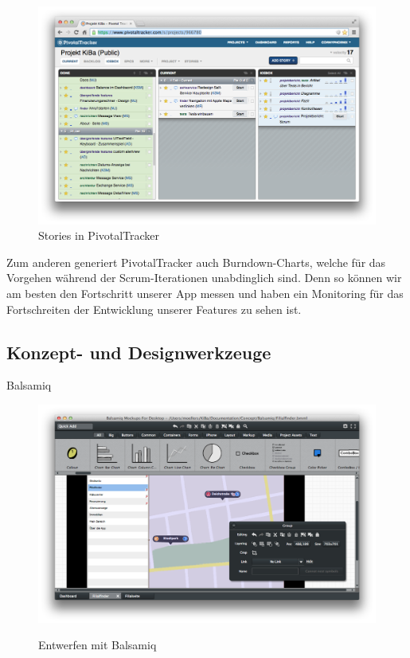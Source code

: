 \begin{figure}[h!]
	\centering
	\includegraphics[scale=.25]{Pictures/TrackerStories}
	\vspace{-.8cm}
	\caption{Stories in PivotalTracker\label{fig:TrackerStories}}
\end{figure}

	Zum anderen generiert PivotalTracker auch Burndown-Charts, welche für das Vorgehen während der Scrum-Iterationen unabdinglich sind. Denn so können wir am besten den Fortschritt unserer App messen und haben ein Monitoring für das Fortschreiten der Entwicklung unserer Features zu sehen ist.

\subsection{Konzept- und Designwerkzeuge}
Balsamiq
\begin{figure}
	\centering
	\includegraphics[scale=.3]{Pictures/BalsamiqEntwurf}
	\label{fig:BalsamiqEntwurf}
	\caption{Entwerfen mit Balsamiq}
\end{figure}

